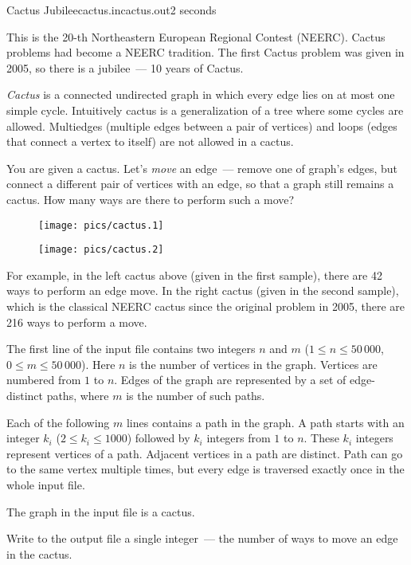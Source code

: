 \begin{problem}{Cactus Jubilee}{cactus.in}{cactus.out}{2 seconds}


This is the 20-th Northeastern European Regional Contest (NEERC). 
Cactus problems had become a NEERC tradition. The first Cactus problem 
was given in 2005, so there is a jubilee~--- 10 years of Cactus.

\emph{Cactus} is a connected undirected graph in which every edge lies on at most one 
simple cycle. Intuitively cactus is a generalization of a tree where some cycles 
are allowed. Multiedges (multiple edges between a pair of vertices) and 
loops (edges that connect a vertex to itself) are not allowed in a cactus. 

You are given a cactus.
Let's \emph{move} an edge~--- remove one of graph's edges, but connect a different pair of vertices with 
an edge, so that a graph still remains a cactus. How many ways are there to 
perform such a move? 

\begin{figure}[h!]
\begin{minipage}[c]{0.5\textwidth}
\centering\texttt{[image: pics/cactus.1]}
\end{minipage}%
\begin{minipage}[c]{0.5\textwidth}
\centering\texttt{[image: pics/cactus.2]}
\end{minipage}%
\end{figure}

For example, in the left cactus above (given in the first sample), 
there are 42 ways to perform an edge move.
In the right cactus (given in the second sample), 
which is the classical NEERC cactus since the original problem in 2005, 
there are 216 ways to perform a move.

\InputFile

The first line of the input file contains two integers $n$ and $m$ 
($1 \le n \le 50\,000$, $0 \le m \le 50\,000$). Here $n$ is the number of vertices in the 
graph. Vertices are numbered from $1$ to $n$. Edges of the graph are represented by 
a set of edge-distinct paths, where $m$ is the number of such paths. 

Each of the following $m$ lines contains a path in the graph. A path starts
with an integer $k_i$ ($2 \le k_i \le 1000$) followed by $k_i$ integers
from $1$ to $n$. These $k_i$ integers represent vertices of a path. Adjacent 
vertices in a path are distinct. Path can 
go to the same vertex multiple times, but every edge is traversed exactly once 
in the whole input file. 

The graph in the input file is a cactus. 

\OutputFile

Write to the output file a single integer~--- the number of ways to move an edge
in the cactus.

\Example

\begin{example}
%
%
\end{example}

\end{problem}
